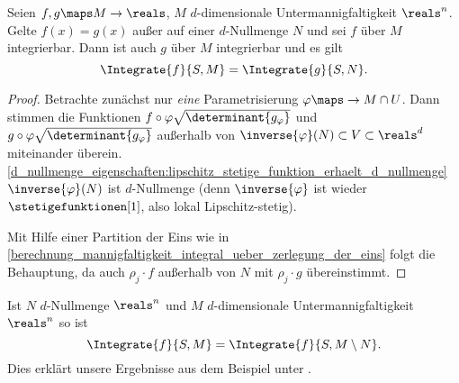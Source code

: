 \begin{satz}
  Seien \( f,g\maps M\to \reals \), \( M \) \( d \)-dimensionale Untermannigfaltigkeit \tsubset \( \reals^n \). Gelte \( f(x)=g(x) \) außer auf einer \( d \)-Nullmenge \( N \) und sei \( f \) über \( M \) integrierbar. Dann ist auch \( g \) über \( M \) integrierbar und es gilt
  \begin{equation*}
    \Integrate{f}{S,M}=\Integrate{g}{S,N}.
  \end{equation*}
\end{satz}
\begin{proof}
  Betrachte zunächst nur \emph{eine} Parametrisierung \( \varphi\maps \to M\cap U \). Dann stimmen die Funktionen \( f\circ \varphi \sqrt{\determinant{g_{\varphi}}}  \) und \( g\circ \varphi\sqrt{\determinant{g_{\varphi}}} \) außerhalb von \( \inverse{\varphi}(N)\subset V\subset \reals^d \) miteinander überein. \ref{d_nullmenge_eigenschaften:lipschitz_stetige_funktion_erhaelt_d_nullmenge} \timplies \( \inverse{\varphi}(N) \) ist \( d \)-Nullmenge (denn \( \inverse{\varphi} \)  ist wieder \( \stetigefunktionen[1] \), also lokal Lipschitz-stetig).
  
  Mit Hilfe einer Partition der Eins wie in \ref{berechnung_mannigfaltigkeit_integral_ueber_zerlegung_der_eins} folgt die Behauptung, da auch \( \rho_j\cdot f \) außerhalb von \( N \) mit \( \rho_j\cdot g \)
  übereinstimmt.
\end{proof}
\begin{folgerung*}
  Ist \( N \) \( d \)-Nullmenge \tsubset \( \reals^n \) und \( M \) \( d \)-dimensionale Untermannigfaltigkeit \tsubset \( \reals^n \) so ist
  \begin{equation*}
    \Integrate{f}{S,M}=\Integrate{f}{S,M\setminus N}.
  \end{equation*}
  Dies erklärt unsere Ergebnisse aus dem Beispiel unter .
\end{folgerung*}
